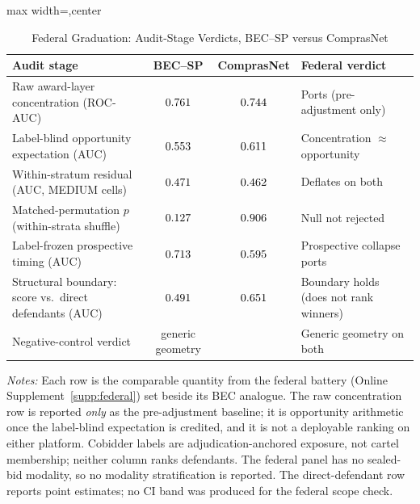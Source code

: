 \begin{table}[htbp]
\centering
\caption{Federal Graduation: Audit-Stage Verdicts, BEC--SP versus ComprasNet}
\label{tab:federal_graduation}
\scriptsize
\begin{adjustbox}{max width=\textwidth,center}
\begin{threeparttable}
\begin{tabular}{p{5.0cm}ccp{3.4cm}}
\toprule
Audit stage & BEC--SP & ComprasNet & Federal verdict \\
\midrule
Raw award-layer concentration (ROC-AUC) & $0.761$ & $0.744$ & Ports (pre-adjustment only) \\
Label-blind opportunity expectation (AUC) & $0.553$ & $0.611$ & Concentration $\approx$ opportunity \\
Within-stratum residual (AUC, MEDIUM cells) & $0.471$ & $0.462$ & Deflates on both \\
Matched-permutation $p$ (within-strata shuffle) & $0.127$ & $0.906$ & Null not rejected \\
Label-frozen prospective timing (AUC) & $0.713$ & $0.595$ & Prospective collapse ports \\
Structural boundary: score vs.\ direct defendants (AUC) & $0.491$ & $0.651$ & Boundary holds (does not rank winners) \\
Negative-control verdict & generic geometry & \valFedAudNegControlVerdict{} & Generic geometry on both \\
\bottomrule
\end{tabular}
\begin{tablenotes}
\scriptsize
\item \textit{Notes:} Each row is the comparable quantity from the federal
battery (Online Supplement~\ref{supp:federal}) set beside its BEC analogue. The raw concentration row is reported \emph{only} as the
pre-adjustment baseline; it is opportunity arithmetic once the label-blind
expectation is credited, and it is not a deployable ranking on either
platform. Cobidder labels are adjudication-anchored exposure, not cartel
membership; neither column ranks defendants. The federal panel has no
sealed-bid modality, so no modality stratification is reported. The
direct-defendant row reports point estimates; no CI band was produced for
the federal scope check.
\end{tablenotes}
\end{threeparttable}
\end{adjustbox}
\end{table}

